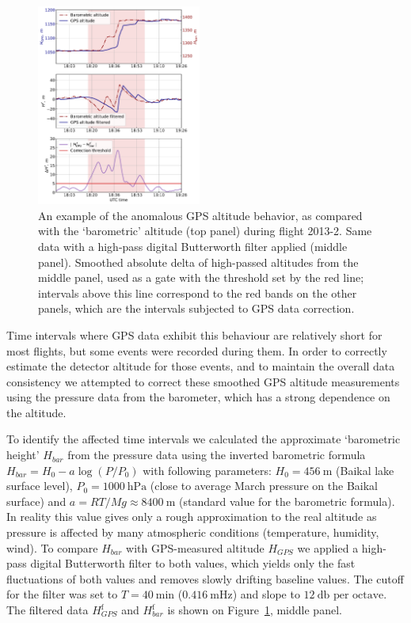\documentclass[universe,article,submit,moreauthors,pdftex]{Definitions/mdpi}
\begin{document}
\begin{figure}[tb]
    \includegraphics[width=0.48\textwidth]{figs/2013-2_gps_correction.pdf} 
    \caption{An example of the anomalous GPS altitude behavior, as compared with the `barometric' altitude (top panel) during flight 2013-2. Same data with a high-pass digital Butterworth filter applied (middle panel). Smoothed absolute delta of high-passed altitudes from the middle panel, used as a gate with the threshold set by the red line; intervals above this line correspond to the red bands on the other panels, which are the intervals subjected to GPS data correction.}
\label{fig:h_corr}
\end{figure}

Time intervals where GPS data exhibit this behaviour are relatively short for most flights, but some events were recorded during them. In order to correctly estimate the detector altitude for those events, and to maintain the overall data consistency we attempted to correct these smoothed GPS altitude measurements using the pressure data from the barometer, which has a strong dependence on the altitude.

To identify the affected time intervals we calculated the approximate `barometric height' $H_{bar}$ from the pressure data using the inverted barometric formula $H_{bar} = H_0 - a \log (P/P_0)$ with following parameters: $H_0 = 456~\textrm{m}$ (Baikal lake surface level), $P_0 = 1000~\textrm{hPa}$ (close to average March pressure on the Baikal surface) and $a = {RT}/{Mg} \approx 8400~\textrm{m}$ (standard value for the barometric formula). In reality this value gives only a rough approximation to the real altitude as pressure is affected by many atmospheric conditions (temperature, humidity, wind). To compare $H_{bar}$ with GPS-measured altitude $H_{GPS}$ we applied a high-pass digital Butterworth filter to both values, which yields only the fast fluctuations of both values and removes slowly drifting baseline values. The cutoff for the filter was set to $T=40~\textrm{min}$ ($0.416~\textrm{mHz}$) and slope to $12~\textrm{db per octave}$. The filtered data $H_{GPS}^{\textrm{f}}$ and $H_{bar}^{\textrm{f}}$ is shown on Figure~\ref{fig:h_corr}, middle panel.
\end{document}
